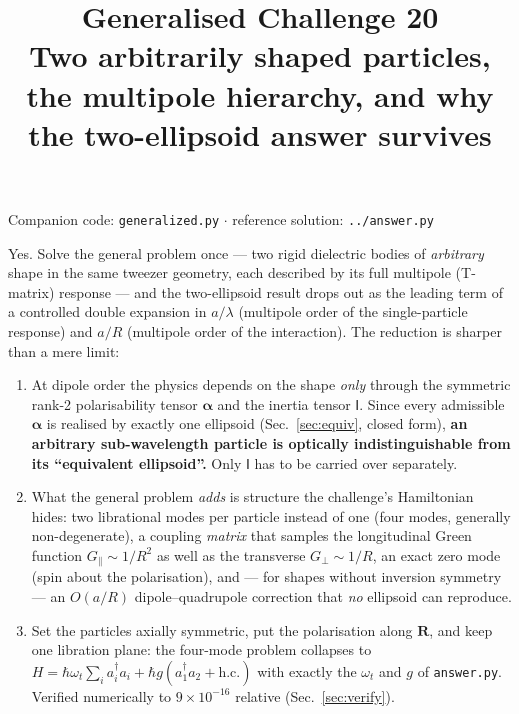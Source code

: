 \documentclass[11pt,a4paper]{article}
\title{\bfseries Generalised Challenge 20\\[2pt]
\large Two arbitrarily shaped particles, the multipole hierarchy, and why the
two-ellipsoid answer survives}
\author{}
\date{}
\newcommand{\bal}{\boldsymbol{\alpha}}
\begin{document}
\maketitle
\vspace{-2.2\baselineskip}

\begin{center}\small
Companion code: \texttt{generalized.py} \quad$\cdot$\quad
reference solution: \texttt{../answer.py}
\end{center}

\begin{tcolorbox}[colback=green!4,colframe=green!35!black,title=Short answer]
Yes.  Solve the general problem once --- two rigid dielectric bodies of
\emph{arbitrary} shape in the same tweezer geometry, each described by its full
multipole (T-matrix) response --- and the two-ellipsoid result drops out as the
leading term of a controlled double expansion in $a/\lambda$ (multipole order of
the single-particle response) and $a/R$ (multipole order of the interaction).
The reduction is sharper than a mere limit:
\begin{enumerate}\itemsep1pt
\item At dipole order the physics depends on the shape \emph{only} through the
symmetric rank-2 polarisability tensor $\bal$ and the inertia tensor
$\mathsf I$.  Since every admissible $\bal$ is realised by exactly one
ellipsoid (Sec.~\ref{sec:equiv}, closed form), \textbf{an arbitrary
sub-wavelength particle is optically indistinguishable from its ``equivalent
ellipsoid''.}  Only $\mathsf I$ has to be carried over separately.
\item What the general problem \emph{adds} is structure the challenge's
Hamiltonian hides: two librational modes per particle instead of one (four
modes, generally non-degenerate), a coupling \emph{matrix} that samples the
longitudinal Green function $G_{\parallel}\sim1/R^{2}$ as well as the transverse
$G_{\perp}\sim1/R$, an exact zero mode (spin about the polarisation), and --- for
shapes without inversion symmetry --- an $O(a/R)$ dipole--quadrupole correction
that \emph{no} ellipsoid can reproduce.
\item Set the particles axially symmetric, put the polarisation along
$\mathbf R$, and keep one libration plane: the four-mode problem collapses to
$H=\hbar\omega_t\sum_i a_i^{\dagger}a_i+\hbar g(a_1^{\dagger}a_2+\mathrm{h.c.})$
with exactly the $\omega_t$ and $g$ of \texttt{answer.py}.  Verified numerically
to $9\times10^{-16}$ relative (Sec.~\ref{sec:verify}).
\end{enumerate}
\end{tcolorbox}
\end{document}
